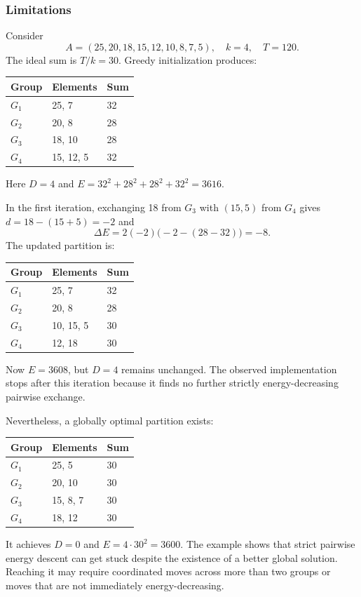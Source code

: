 \documentclass[11pt,a4paper]{article}
\begin{document}
\subsubsection{Limitations}
Consider
\begin{equation*}A=(25,20,18,15,12,10,8,7,5),\quad k=4,\quad T=120.\end{equation*}
The ideal sum is $T/k=30$. Greedy initialization produces:
\begin{center}\begin{tabular}{lll}\toprule Group & Elements & Sum\\\midrule $G_1$ & 25, 7 & 32\\ $G_2$ & 20, 8 & 28\\ $G_3$ & 18, 10 & 28\\ $G_4$ & 15, 12, 5 & 32\\\bottomrule\end{tabular}\end{center}
Here $D=4$ and $E=32^2+28^2+28^2+32^2=3616$.

In the first iteration, exchanging 18 from $G_3$ with $(15,5)$ from $G_4$ gives $d=18-(15+5)=-2$ and
\begin{equation*}\Delta E=2(-2)\bigl(-2-(28-32)\bigr)=-8.\end{equation*}
The updated partition is:
\begin{center}\begin{tabular}{lll}\toprule Group & Elements & Sum\\\midrule $G_1$ & 25, 7 & 32\\ $G_2$ & 20, 8 & 28\\ $G_3$ & 10, 15, 5 & 30\\ $G_4$ & 12, 18 & 30\\\bottomrule\end{tabular}\end{center}
Now $E=3608$, but $D=4$ remains unchanged. The observed implementation stops after this iteration because it finds no further strictly energy-decreasing pairwise exchange.

Nevertheless, a globally optimal partition exists:
\begin{center}\begin{tabular}{lll}\toprule Group & Elements & Sum\\\midrule $G_1$ & 25, 5 & 30\\ $G_2$ & 20, 10 & 30\\ $G_3$ & 15, 8, 7 & 30\\ $G_4$ & 18, 12 & 30\\\bottomrule\end{tabular}\end{center}
It achieves $D=0$ and $E=4\cdot30^2=3600$. The example shows that strict pairwise energy descent can get stuck despite the existence of a better global solution. Reaching it may require coordinated moves across more than two groups or moves that are not immediately energy-decreasing.
\end{document}
